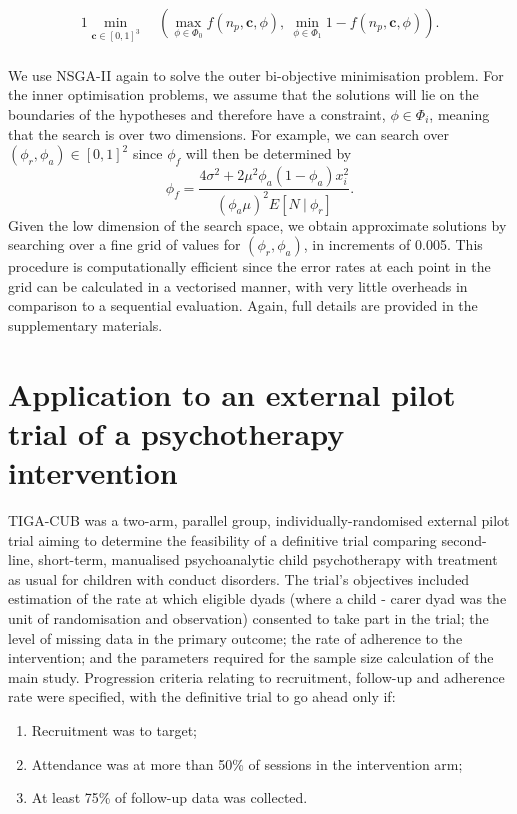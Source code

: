 \documentclass{article}
\begin{document}
\begin{alignat*}{1}
\min_{\mathbf{c} \in [0,1]^3} ~ & \left( \max_{\phi \in \Phi_0} f(n_p, \mathbf{c}, \phi) , ~ \min_{\phi \in \Phi_1} 1 - f(n_p, \mathbf{c}, \phi) \right). \\
\end{alignat*}

We use NSGA-II again to solve the outer bi-objective minimisation problem. For the inner optimisation problems, we assume that the solutions will lie on the boundaries of the hypotheses and therefore have a constraint, $\phi \in \Phi_i$, meaning that the search is over two dimensions. For example, we can search over $(\phi_r, \phi_a) \in [0,1]^2$ since $\phi_f$ will then be determined by
$$
\phi_f = \frac{4\sigma^2 + 2\mu^2 \phi_a(1-\phi_a)x_i^2}{(\phi_a \mu)^2 E[N ~|~ \phi_r]}.
$$
Given the low dimension of the search space, we obtain approximate solutions by searching over a fine grid of values for $(\phi_r, \phi_a)$, in increments of 0.005. This procedure is computationally efficient since the error rates at each point in the grid can be calculated in a vectorised manner, with very little overheads in comparison to a sequential evaluation. Again, full details are provided in the supplementary materials. 

\section{Application to an external pilot trial of a psychotherapy intervention}\label{sec:example}

TIGA-CUB \cite{Edginton2017} was a two-arm, parallel group, individually-randomised external pilot trial aiming to determine the feasibility of a definitive trial comparing second-line, short-term, manualised psychoanalytic child psychotherapy with treatment as usual for children with conduct disorders. The trial's objectives included estimation of the rate at which eligible dyads (where a child - carer dyad was the unit of randomisation and observation) consented to take part in the trial; the level of missing data in the primary outcome; the rate of adherence to the intervention; and the parameters required for the sample size calculation of the main study. Progression criteria relating to recruitment, follow-up and adherence rate were specified, with the definitive trial to go ahead only if:
\begin{enumerate}
\item Recruitment was to target;
\item Attendance was at more than 50\% of sessions in the intervention arm;
\item At least 75\% of follow-up data was collected.
\end{enumerate}
\end{document}
